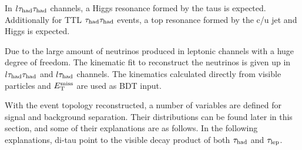 


In $l\tau_\text{had}{}\tau_\text{had}$ channels, a Higgs resonance formed by the taus is expected. Additionally for TTL $\tau_\text{had}{}\tau_\text{had}$ events, a top resonance formed by the c/u jet and Higgs is expected.

Due to the large amount of neutrinos produced in leptonic channels with a huge degree of freedom. The kinematic fit to reconstruct the neutrinos is given up in $l\tau_\text{had}{}\tau_\text{had}$ and $l\tau_\text{had}$ channels. The kinematics calculated directly from visible particles and $E_{\text{T}}^{\text{miss}}$ are used as BDT input.

With the event topology reconstructed, a number of variables are defined for signal and background separation. Their distributions can be found later in this section, and some of their explanations are as follows. In the following explanations, di-tau point to the visible decay product of both $\tau_\text{had}$ and $\tau_\text{lep}$.

